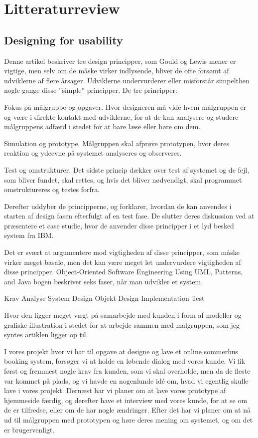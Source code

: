\documentclass[12pt,a4paper]{article}
\begin{document}
\section{Litteraturreview}
\subsection{Designing for usability}
Denne artikel beskriver tre design principper, som Gould og Lewis mener er vigtige, men selv om de måske virker indlysende, bliver de ofte forsømt af udviklerne af flere årsager. Udviklerne undervurderer eller misforstår simpelthen nogle gange disse ”simple” principper. De tre principper: 

Fokus på målgruppe og opgaver. 
Hvor designeren må vide hvem målgruppen er og være i direkte kontakt med udviklerne, for at de kan analysere og studere målgruppens adfærd i stedet for at bare læse eller høre om dem. 

Simulation og prototype.
Målgruppen skal afprøve prototypen, hvor deres reaktion og ydeevne på systemet analyseres og observeres.

Test og omstrukturer.
Det sidste princip dækker over test af systemet og de fejl, som bliver fundet, skal rettes, og hvis det bliver nødvendigt, skal programmet omstruktureres og testes forfra.

Derefter uddyber de principperne, og forklarer, hvordan de kan anvendes i starten af design fasen efterfulgt af en test fase. De slutter deres diskussion ved at præsentere et case studie, hvor de anvender disse principper i et lyd besked system fra IBM.   

Det er svært at argumentere mod vigtigheden af disse principper, som måske virker meget basale, men det kan være meget let undervurdere vigtigheden af disse principper. Object-Oriented Software Engineering Using UML, Patterns, and Java bogen beskriver seks faser, når man udvikler et system.

Krav
Analyse
System Design
Objekt Design
Implementation
Test

Hvor den ligger meget vægt på samarbejde med kunden i form af modeller og grafiske illustration i stedet for at arbejde sammen med målgruppen, som jeg syntes artiklen ligger op til.

I vores projekt hvor vi har til opgave at designe og lave et online sommerhus booking system, forsøger vi at holde en løbende dialog med vores kunde. Vi fik først og fremmest nogle krav fra kunden, som vi skal overholde, men da de fleste var kommet på plads, og vi havde en nogenlunde idé om, hvad vi egentlig skulle lave i vores projekt. Dernæst har vi planer om at lave vores prototype af hjemmeside færdig, og derefter have et interview med vores kunde, for at se om de er tilfredse, eller om de har nogle ændringer. Efter det har vi planer om at nå ud til målgruppen med prototypen og høre deres mening om systemet, og om det er brugervenligt.
\end{document}
